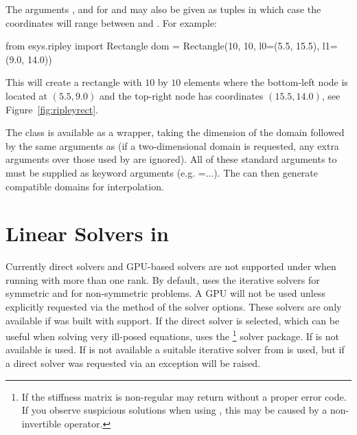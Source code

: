 \noindent The arguments ,  and  for 
and  may also be given as tuples  in which
case the coordinates will range between  and . For example:
\begin{python}
   from esys.ripley import Rectangle
   dom = Rectangle(10, 10, l0=(5.5, 15.5), l1=(9.0, 14.0))
\end{python}

\noindent This will create a rectangle with $10$ by $10$ elements where the
bottom-left node is located at $(5.5, 9.0)$ and the top-right node has
coordinates $(15.5, 14.0)$, see Figure~\ref{fig:ripleyrect}.

The  class is available as a wrapper, taking the
dimension of the domain followed by the same arguments as  (if
a two-dimensional domain is requested, any extra arguments over those used by
 are ignored). All of these standard arguments to
 must be supplied as keyword arguments
(e.g. =...). The  can then generate
compatible domains for interpolation.

\section{Linear Solvers in \SolverOptions}
Currently direct solvers and GPU-based solvers are not supported under \MPI
when running with more than one rank.
By default, \ripley uses the iterative solvers \PCG for symmetric and \BiCGStab
for non-symmetric problems.
A GPU will not be used unless explicitly requested via the
 method of the solver options.
These solvers are only available if \ripley was built with \CUDA support.
If the direct solver is selected, which can be useful when solving very
ill-posed equations, \ripley uses the \MKL\footnote{If the stiffness matrix is
non-regular \MKL may return without a proper error code. If you observe
suspicious solutions when using \MKL, this may be caused by a non-invertible
operator.} solver package. If \MKL is not available \UMFPACK is used.
If \UMFPACK is not available a suitable iterative solver from \PASO is used, but
if a direct solver was requested via \SolverOptions an exception will be
raised.



